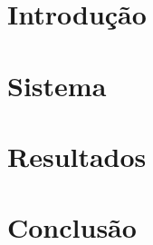 \documentclass[a4paper]{article}
\begin{document}


\tableofcontents
{}
\pagebreak
{}
\setcounter{page}{1}

\section{Introdução}


\section{Sistema}


\section{Resultados}


\section{Conclusão}

\pagebreak

\listoffigures
\listoftables
\end{document}

